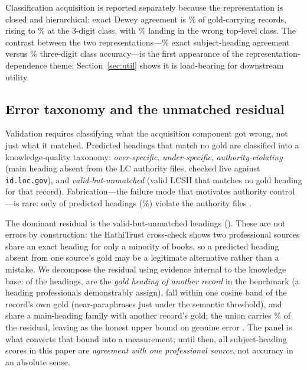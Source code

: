 Classification acquisition is reported separately because the
representation is closed and hierarchical: exact Dewey agreement is
\CatDDCExact\% of gold-carrying records, rising to \CatDDCClass\% at the
3-digit class, with \CatDDCWrongBranch\% landing in the wrong top-level
class. The contrast between the two representations---\CatExact\% exact
subject-heading agreement versus \CatDDCClass\% three-digit class
accuracy---is the first appearance of the representation-dependence theme;
Section~\ref{sec:util} shows it is load-bearing for downstream utility.

\subsection{Error taxonomy and the unmatched residual}

Validation requires classifying what the acquisition component got wrong,
not just what it matched. Predicted headings that match no gold are
classified into a knowledge-quality taxonomy: \emph{over-specific},
\emph{under-specific}, \emph{authority-violating} (main heading absent from
the LC authority files, checked live against \texttt{id.loc.gov}), and
\emph{valid-but-unmatched} (valid LCSH that matches no gold heading for that
record). Fabrication---the failure mode that motivates authority
control---is rare: only \CatAuthorityViolations{} of \CatPredHeadings{}
predicted headings (\CatAuthorityRate\%) violate the authority files
.

The dominant residual is the \CatUnmatched{} valid-but-unmatched headings
(). These are not errors by construction: the
HathiTrust cross-check shows two professional sources share an exact
heading for only a minority of books, so a predicted heading absent from one
source's gold may be a legitimate alternative rather than a mistake. We
decompose the residual using evidence internal to the knowledge base: of the
\CatUnmatched{} headings, \UnmGoldElsewhere{} are the \emph{gold heading of
another record} in the benchmark (a heading professionals demonstrably
assign), \UnmNearSem{} fall within one cosine band of the record's own gold
(near-paraphrases just under the semantic threshold), and \UnmFamily{}
share a main-heading family with another record's gold; the union carries
\UnmShare\% of the residual, leaving \UnmResidual{} as the honest upper
bound on genuine error . The
panel is what converts that bound into a measurement; until then, all
subject-heading scores in this paper are \emph{agreement with one
professional source}, not accuracy in an absolute sense.

